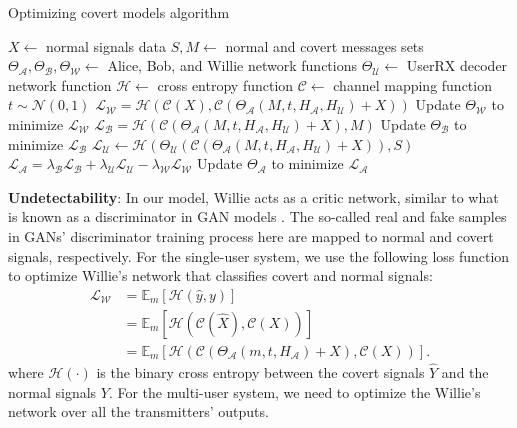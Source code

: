 \begin{algorithm}[tp!]
	\caption{Optimizing covert models algorithm}\label{alg:cap}
	\small
	\begin{algorithmic}
		\State $X \gets$ normal signals data
		\State $S, M \gets$ normal and covert messages sets
		\State $\Theta_{\mathcal{A}}, \Theta_{\mathcal{B}}, \Theta_{\mathcal{W}} \gets$ Alice, Bob, and Willie network functions
		\State $\Theta_{\mathcal{U}} \gets$ UserRX decoder network function
		\State $\mathcal{H} \gets$ cross entropy function
		\State $\mathcal{C} \gets$ channel mapping function
		\State $t \sim \mathcal{N}(0, 1)$
		\State $\mathcal{L}_{\mathcal{W}} = \mathcal{H}(\mathcal{C}(X), \mathcal{C}(\Theta_{\mathcal{A}}(M, t, H_{\mathcal{A}}, H_{\mathcal{U}}) + X))$
		\State Update $\Theta_{\mathcal{W}}$ to minimize $\mathcal{L}_{\mathcal{W}}$
		\State $\mathcal{L}_{\mathcal{B}} = \mathcal{H}(\mathcal{C}(\Theta_{\mathcal{A}}(M, t, H_{\mathcal{A}}, H_{\mathcal{U}}) + X), M)$
		\State Update $\Theta_{\mathcal{B}}$ to minimize $\mathcal{L}_{\mathcal{B}}$
		\State $\mathcal{L}_{\mathcal{U}} \gets \mathcal{H}(\Theta_{\mathcal{U}}(\mathcal{C}(\Theta_{\mathcal{A}}(M, t, H_{\mathcal{A}}, H_{\mathcal{U}}) + X)), S)$
		\State
		$\mathcal{L}_{\mathcal{A}} = \lambda_{\mathcal{B}} \mathcal{L}_{\mathcal{B}} + \lambda_{\mathcal{U}} \mathcal{L}_{\mathcal{U}} - \lambda_{\mathcal{W}} \mathcal{L}_{\mathcal{W}}$
		\State Update $\Theta_{\mathcal{A}}$ to minimize $\mathcal{L}_{\mathcal{A}}$
		\EndFor
	\end{algorithmic}
\end{algorithm}

\textbf{Undetectability}: In our model, Willie acts as a critic network, similar to what is known as a discriminator in GAN models \cite{goodfellow2014generative}. The so-called real and fake samples in GANs' discriminator training process here are mapped to normal and covert signals, respectively. For the single-user system, we use the following loss function to optimize Willie's network that classifies covert and normal signals:
\begin{equation}
	\begin{aligned} \label{willie_loss}
	\mathcal{L}_{\mathcal{W}} & = \mathbb{E}_{m}[\mathcal{H}(\hat{y}, y)] \\
	& = \mathbb{E}_{m}[\mathcal{H}(\mathcal{C}(\hat{X}), \mathcal{C}(X))] \\
	& = \mathbb{E}_{m}[\mathcal{H}(\mathcal{C}(\Theta_{\mathcal{A}}(m, t, H_{\mathcal{A}}) + X), \mathcal{C}(X))].
	\end{aligned}
\end{equation}
where \(\mathcal{H}(\cdot)\) is the binary cross entropy between the covert signals \(\hat{Y}\) and the normal signals \(Y\). For the multi-user system, we need to optimize the Willie's network over all the transmitters' outputs.

